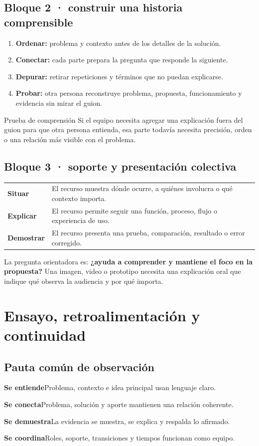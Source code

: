 \documentclass[10pt,a4paper]{article}
\newcommand{\criterion}[3]{%
  \begin{tcolorbox}[colback=#3!7,colframe=#3,boxrule=0.5pt,arc=1mm,left=2mm,right=2mm,top=1.6mm,bottom=1.6mm,before skip=2pt,after skip=2pt]
  {\bfseries\textcolor{AIEPNavy}{#1}}\hfill{\small #2}
  \end{tcolorbox}
}
\begin{document}
\subsection{Bloque 2 · construir una historia comprensible}
\begin{enumerate}
  \item \textbf{Ordenar:} problema y contexto antes de los detalles de la solución.
  \item \textbf{Conectar:} cada parte prepara la pregunta que responde la siguiente.
  \item \textbf{Depurar:} retirar repeticiones y términos que no puedan explicarse.
  \item \textbf{Probar:} otra persona reconstruye problema, propuesta, funcionamiento y evidencia sin mirar el guion.
\end{enumerate}

\begin{navybox}{Prueba de comprensión}
Si el equipo necesita agregar una explicación fuera del guion para que otra persona entienda, esa parte todavía necesita precisión, orden o una relación más visible con el problema.
\end{navybox}

\subsection{Bloque 3 · soporte y presentación colectiva}
\begin{tabularx}{\textwidth}{@{}p{35mm}Y@{}}
\textbf{Situar} & El recurso muestra dónde ocurre, a quiénes involucra o qué contexto importa. \\
\textbf{Explicar} & El recurso permite seguir una función, proceso, flujo o experiencia de uso. \\
\textbf{Demostrar} & El recurso presenta una prueba, comparación, resultado o error corregido. \\
\end{tabularx}

La pregunta orientadora es: \textbf{¿ayuda a comprender y mantiene el foco en la propuesta?} Una imagen, video o prototipo necesita una explicación oral que indique qué observa la audiencia y por qué importa.

\newpage
\section{Ensayo, retroalimentación y continuidad}

\subsection{Pauta común de observación}
\criterion{Se entiende}{Problema, contexto e idea principal usan lenguaje claro.}{AIEPRed}
\criterion{Se conecta}{Problema, solución y aporte mantienen una relación coherente.}{AIEPCyan}
\criterion{Se demuestra}{La evidencia se muestra, se explica y respalda lo afirmado.}{AIEPGold}
\criterion{Se coordina}{Roles, soporte, transiciones y tiempos funcionan como equipo.}{AIEPGreen}
\end{document}
